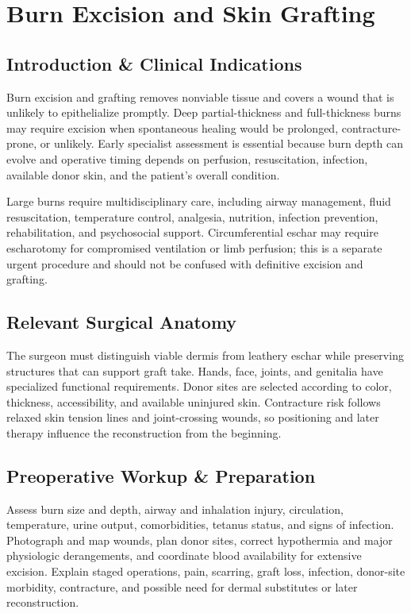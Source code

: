 \chapter{Burn Excision and Skin Grafting}

\section*{Introduction \& Clinical Indications}
Burn excision and grafting removes nonviable tissue and covers a wound that is unlikely to epithelialize promptly. Deep partial-thickness and full-thickness burns may require excision when spontaneous healing would be prolonged, contracture-prone, or unlikely. Early specialist assessment is essential because burn depth can evolve and operative timing depends on perfusion, resuscitation, infection, available donor skin, and the patient’s overall condition.

Large burns require multidisciplinary care, including airway management, fluid resuscitation, temperature control, analgesia, nutrition, infection prevention, rehabilitation, and psychosocial support. Circumferential eschar may require escharotomy for compromised ventilation or limb perfusion; this is a separate urgent procedure and should not be confused with definitive excision and grafting.

\section*{Relevant Surgical Anatomy}
The surgeon must distinguish viable dermis from leathery eschar while preserving structures that can support graft take. Hands, face, joints, and genitalia have specialized functional requirements. Donor sites are selected according to color, thickness, accessibility, and available uninjured skin. Contracture risk follows relaxed skin tension lines and joint-crossing wounds, so positioning and later therapy influence the reconstruction from the beginning.

\section*{Preoperative Workup \& Preparation}
Assess burn size and depth, airway and inhalation injury, circulation, temperature, urine output, comorbidities, tetanus status, and signs of infection. Photograph and map wounds, plan donor sites, correct hypothermia and major physiologic derangements, and coordinate blood availability for extensive excision. Explain staged operations, pain, scarring, graft loss, infection, donor-site morbidity, contracture, and possible need for dermal substitutes or later reconstruction.

